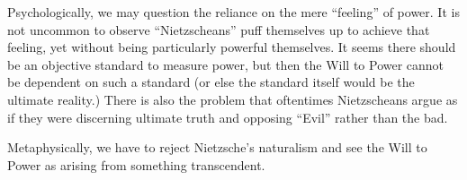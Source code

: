 Psychologically, we may question the reliance on the mere ``feeling'' of power. It is not uncommon to observe ``Nietzscheans'' puff themselves up to achieve that feeling, yet without being particularly powerful themselves. It seems there should be an objective standard to measure power, but then the Will to Power cannot be dependent on such a standard (or else the standard itself would be the ultimate reality.) There is also the problem that oftentimes Nietzscheans argue as if they were discerning ultimate truth and opposing ``Evil'' rather than the bad.

Metaphysically, we have to reject Nietzsche's naturalism and see the Will to Power as arising from something transcendent.


